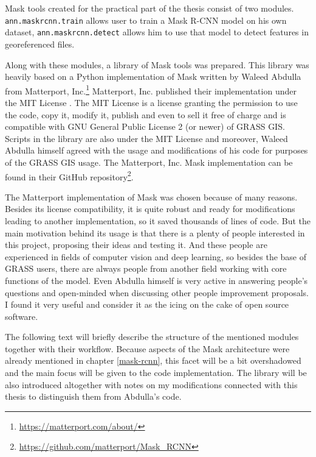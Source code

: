 Mask  tools created for the practical part of the thesis consist of 
two modules. \verb|ann.maskrcnn.train| allows user to train a Mask R-CNN model 
on his own dataset, \verb|ann.maskrcnn.detect| allows him to use that model to 
detect features in georeferenced files.

Along with these modules, a library of Mask  tools was prepared. This 
library was heavily based on a Python implementation of Mask  written 
by Waleed Abdulla from Matterport, 
Inc.\footnote{\url{https://matterport.com/about/}}  Matterport, Inc. published 
their implementation under the MIT License \cite{mit}. The MIT License is a 
license granting the permission to use the code, copy it, modify it, publish and 
even to sell it free of charge and is compatible with GNU General Public License 
2 (or newer) \cite{gplv2} of GRASS GIS. Scripts in the library are also under 
the MIT License and moreover, Waleed Abdulla himself agreed with the usage and 
modifications of his code for purposes of the GRASS GIS usage. The Matterport, 
Inc. Mask  implementation can be found in their GitHub 
repository\footnote{\url{https://github.com/matterport/Mask\_RCNN}}.

The Matterport implementation of Mask  was chosen because of many 
reasons. Besides its license compatibility, it is quite robust and ready for 
modifications leading to another implementation, so it saved thousands of lines 
of code. But the main motivation behind its usage is that there is a plenty of 
people interested in this project, proposing their ideas and testing it. And 
these people are experienced in fields of computer vision and deep learning, so 
besides the base of GRASS  users, there are always people from another 
field working with core functions of the model. Even Abdulla himself is very 
active in answering people's questions and open-minded when discussing other 
people improvement proposals. I found it very useful and consider it as the 
icing on the cake of open source software.

The following text will briefly describe the structure of the mentioned modules 
together with their workflow. Because aspects of the Mask  
architecture were already mentioned in chapter \ref{mask-rcnn}, this facet will 
be a bit overshadowed and the main focus will be given to the code 
implementation. The library will be also introduced altogether with notes on my 
modifications connected with this thesis to distinguish them from Abdulla's 
code.

